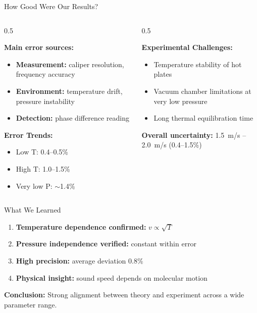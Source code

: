 \documentclass[12pt]{beamer}
\begin{document}
\begin{frame}{How Good Were Our Results?}
\begin{columns}
\begin{column}{0.5\textwidth}

\textbf{Main error sources:}
\begin{itemize}
    \item \textbf{Measurement:} caliper resolution, frequency accuracy
    \item \textbf{Environment:} temperature drift, pressure instability
    \item \textbf{Detection:} phase difference reading
\end{itemize}

\vspace{0.3cm}
\textbf{Error Trends:}
\begin{itemize}
    \item Low T: 0.4--0.5\%
    \item High T: 1.0--1.5\%
    \item Very low P: $\sim$1.4\%
\end{itemize}

\end{column}

\begin{column}{0.5\textwidth}

\textbf{Experimental Challenges:}
\begin{itemize}
    \item Temperature stability of hot plates
    \item Vacuum chamber limitations at very low pressure
    \item Long thermal equilibration time
\end{itemize}

\vspace{0.4cm}
\textbf{Overall uncertainty:}  
\SI{1.5}{m/s} -- \SI{2.0}{m/s} (0.4--1.5\%)

\end{column}
\end{columns}
\end{frame}

\begin{frame}{What We Learned}
\begin{enumerate}
    \item \textbf{Temperature dependence confirmed:} $v \propto \sqrt{T}$
    \item \textbf{Pressure independence verified:} constant within error
    \item \textbf{High precision:} average deviation 0.8\%
    \item \textbf{Physical insight:} sound speed depends on molecular motion
\end{enumerate}

\vspace{0.4cm}
\textbf{Conclusion:}  
Strong alignment between theory and experiment across a wide parameter range.
\end{frame}
\end{document}
